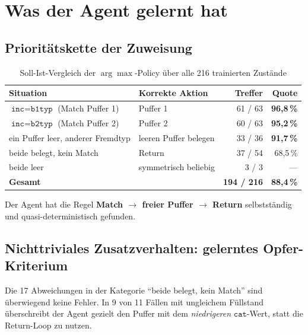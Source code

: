 \documentclass[11pt,a4paper]{article}
\newcommand{\inc}{\texttt{inc}}
\newcommand{\bit}{\texttt{b1typ}}
\newcommand{\bzt}{\texttt{b2typ}}
\newcommand{\cat}{\texttt{cat}}
\begin{document}
\section{Was der Agent gelernt hat}

\subsection{Prioritätskette der Zuweisung}

\begin{table}[htbp]
\centering
\caption{Soll-Ist-Vergleich der $\arg\max$-Policy über alle 216 trainierten Zustände}
\begin{tabularx}{\textwidth}{@{}XL{3.6cm}rr@{}}
\toprule
\textbf{Situation} & \textbf{Korrekte Aktion} &
\textbf{Treffer} & \textbf{Quote} \\
\midrule
$\inc = \bit$ (Match Puffer 1)      & Puffer 1            & 61 / 63 & \textbf{96{,}8\,\%} \\
$\inc = \bzt$ (Match Puffer 2)      & Puffer 2            & 60 / 63 & \textbf{95{,}2\,\%} \\
ein Puffer leer, anderer Fremdtyp   & leeren Puffer belegen & 33 / 36 & \textbf{91{,}7\,\%} \\
beide belegt, kein Match            & Return              & 37 / 54 & 68{,}5\,\% \\
beide leer                          & symmetrisch beliebig &  3 / 3  & --- \\
\midrule
\textbf{Gesamt}                     &                     & \textbf{194 / 216} & \textbf{88{,}4\,\%} \\
\bottomrule
\end{tabularx}
\end{table}

Der Agent hat die Regel \textbf{Match $\rightarrow$ freier Puffer $\rightarrow$
Return} selbstständig und quasi-deterministisch gefunden.

\subsection{Nichttriviales Zusatzverhalten: gelerntes Opfer-Kriterium}

Die 17 Abweichungen in der Kategorie \enquote{beide belegt, kein Match} sind
überwiegend keine Fehler. In 9 von 11 Fällen mit ungleichem Füllstand
überschreibt der Agent gezielt den Puffer mit dem \emph{niedrigeren}
$\cat$-Wert, statt die Return-Loop zu nutzen.
\end{document}
